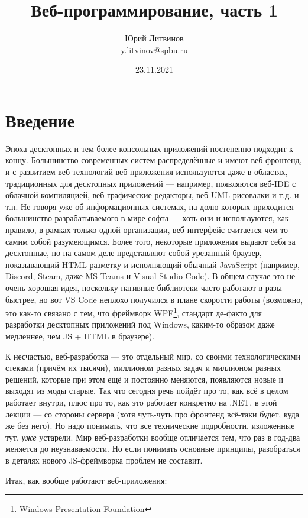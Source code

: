 \documentclass[a5paper]{article}
\title{Веб-программирование, часть 1}
\author{Юрий Литвинов\\\small{y.litvinov@spbu.ru}}
\date{23.11.2021}
\begin{document}
\maketitle
\thispagestyle{empty}

\section{Введение}

Эпоха десктопных и тем более консольных приложений постепенно подходит к концу. Большинство современных систем распределённые и имеют веб-фронтенд, и с развитием веб-технологий веб-приложения используются даже в областях, традиционных для десктопных приложений --- например, появляются веб-IDE с облачной компиляцией, веб-графические редакторы, веб-UML-рисовалки и т.д. и т.п. Не говоря уже об информационных системах, на долю которых приходится большинство разрабатываемого в мире софта --- хоть они и используются, как правило, в рамках только одной организации, веб-интерфейс считается чем-то самим собой разумеющимся. Более того, некоторые приложения выдают себя за десктопные, но на самом деле представляют собой урезанный браузер, показывающий HTML-разметку и исполняющий обычный JavaScript (например, Discord, Steam, даже MS Teams и Visual Studio Code). В общем случае это не очень хорошая идея, поскольку нативные библиотеки часто работают в разы быстрее, но вот VS Code неплохо получился в плане скорости работы (возможно, это как-то связано с тем, что фреймворк WPF\footnote{Windows Presentation Foundation}, стандарт де-факто для разработки десктопных приложений под Windows, каким-то образом даже медленнее, чем JS + HTML в браузере).

К несчастью, веб-разработка --- это отдельный мир, со своими технологическими стеками (причём их тысячи), миллионом разных задач и миллионом разных решений, которые при этом ещё и постоянно меняются, появляются новые и выходят из моды старые. Так что сегодня речь пойдёт про то, как всё в целом работает внутри, плюс про то, как это работает конкретно на .NET, в этой лекции --- со стороны сервера (хотя чуть-чуть про фронтенд всё-таки будет, куда же без него). Но надо понимать, что все технические подробности, изложенные тут, \emph{уже} устарели. Мир веб-разработки вообще отличается тем, что раз в год-два меняется до неузнаваемости. Но если понимать основные принципы, разобраться в деталях нового JS-фреймворка проблем не составит.

Итак, как вообще работают веб-приложения:
\end{document}
